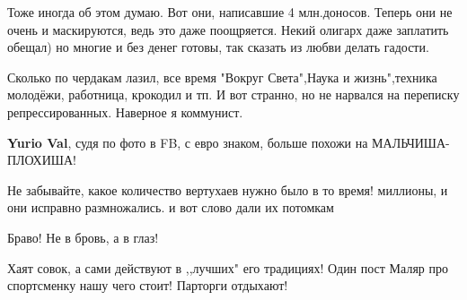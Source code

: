 \begin{itemize}
Тоже иногда об этом думаю. Вот они, написавшие 4 млн.доносов. Теперь они не
очень и маскируются, ведь это даже поощряется. Некий олигарх даже заплатить
обещал) но многие и без денег готовы, так сказать из любви делать гадости.


 

Сколько по чердакам лазил, все время "Вокруг Света",Наука и жизнь",техника
молодёжи, работница, крокодил и тп. И вот странно, но не нарвался на переписку
репрессированных. Наверное я коммунист.

\begin{itemize}
 
\textbf{Yurio Val}, судя по фото в FB, с евро знаком, больше похожи на МАЛЬЧИША- ПЛОХИША!
\end{itemize}

 
Не забывайте, какое количество вертухаев нужно было в то время! миллионы, и они исправно размножались. и вот слово дали их потомкам

 
Браво! Не в бровь, а в глаз!

 
Хаят совок, а сами действуют в ,,лучших" его традициях! Один пост Маляр про спортсменку нашу чего стоит! Парторги отдыхают!


\end{itemize}
